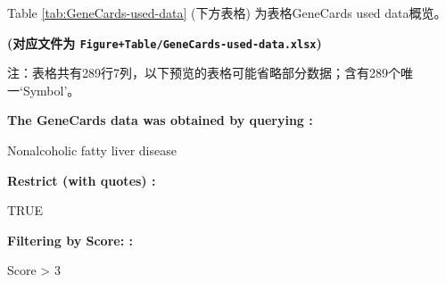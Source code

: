 \documentclass[
]{article}
\begin{document}
\begin{center}\vspace{1.5cm}\end{center}

Table \ref{tab:GeneCards-used-data} (下方表格) 为表格GeneCards used data概览。

\textbf{(对应文件为 \texttt{Figure+Table/GeneCards-used-data.xlsx})}

\begin{center}\begin{tcolorbox}[colback=gray!10, colframe=gray!50, width=0.9\linewidth, arc=1mm, boxrule=0.5pt]注：表格共有289行7列，以下预览的表格可能省略部分数据；含有289个唯一`Symbol'。
\end{tcolorbox}
\end{center}\begin{center}\begin{tcolorbox}[colback=gray!10, colframe=gray!50, width=0.9\linewidth, arc=1mm, boxrule=0.5pt]
\textbf{
The GeneCards data was obtained by querying
:}

\vspace{0.5em}

    Nonalcoholic fatty liver disease

\vspace{2em}


\textbf{
Restrict (with quotes)
:}

\vspace{0.5em}

    TRUE

\vspace{2em}


\textbf{
Filtering by Score:
:}

\vspace{0.5em}

    Score > 3

\vspace{2em}
\end{tcolorbox}
\end{center}
\end{document}

